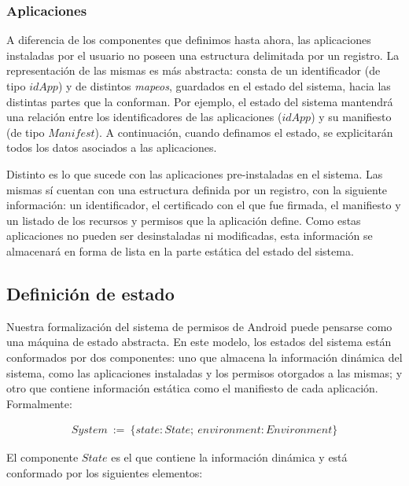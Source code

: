 \subsubsection*{Aplicaciones}
A diferencia de los componentes que definimos hasta ahora, las aplicaciones instaladas por el
usuario no poseen una estructura delimitada por un registro. La representación de las mismas es más
abstracta: consta de un identificador (de tipo $idApp$) y de distintos \textit{mapeos}, guardados en
el estado del sistema, hacia las distintas partes que la conforman. Por ejemplo, el estado del
sistema mantendrá una relación entre los identificadores de las aplicaciones ($idApp$) y su
manifiesto (de tipo $Manifest$). A continuación, cuando definamos el estado, se explicitarán todos
los datos asociados a las aplicaciones.

Distinto es lo que sucede con las aplicaciones pre-instaladas en el sistema. Las mismas sí cuentan
con una estructura definida por un registro, con la siguiente información: un identificador, el
certificado con el que fue firmada, el manifiesto y un listado de los recursos y permisos que la
aplicación define. Como estas aplicaciones no pueden ser desinstaladas ni modificadas, esta
información se almacenará en forma de lista en la parte estática del estado del sistema.

\subsection{Definición de estado}
Nuestra formalización del sistema de permisos de Android puede pensarse como una máquina de estado
abstracta. En este modelo, los estados del sistema están conformados por dos componentes: uno que
almacena la información dinámica del sistema, como las aplicaciones instaladas y los permisos
otorgados a las mismas; y otro que contiene información estática como el manifiesto de cada
aplicación. Formalmente:

\begin{align*}
    System\ :=\ \{ state: State;\ environment: Environment \}
\end{align*}


El componente $State$ es el que contiene la información dinámica y está conformado por los
siguientes elementos:

